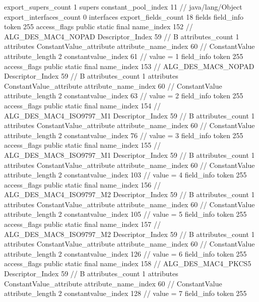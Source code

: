{{{			export_supers_count	1
			supers {
				constant_pool_index	11		// java/lang/Object
			}
			export_interfaces_count	0
			interfaces {
			}
			export_fields_count	18
			fields {
			field_info {
				token	255
				access_flags	public static final
				name_index	152		// ALG_DES_MAC4_NOPAD
				Descriptor_Index	59		// B
				attributes_count	1
				attributes {
				ConstantValue_attribute {
					attribute_name_index	60		// ConstantValue
					attribute_length	2
					constantvalue_index	61		// value = 1
				}
				}
			}
			field_info {
				token	255
				access_flags	public static final
				name_index	153		// ALG_DES_MAC8_NOPAD
				Descriptor_Index	59		// B
				attributes_count	1
				attributes {
				ConstantValue_attribute {
					attribute_name_index	60		// ConstantValue
					attribute_length	2
					constantvalue_index	63		// value = 2
				}
				}
			}
			field_info {
				token	255
				access_flags	public static final
				name_index	154		// ALG_DES_MAC4_ISO9797_M1
				Descriptor_Index	59		// B
				attributes_count	1
				attributes {
				ConstantValue_attribute {
					attribute_name_index	60		// ConstantValue
					attribute_length	2
					constantvalue_index	76		// value = 3
				}
				}
			}
			field_info {
				token	255
				access_flags	public static final
				name_index	155		// ALG_DES_MAC8_ISO9797_M1
				Descriptor_Index	59		// B
				attributes_count	1
				attributes {
				ConstantValue_attribute {
					attribute_name_index	60		// ConstantValue
					attribute_length	2
					constantvalue_index	103		// value = 4
				}
				}
			}
			field_info {
				token	255
				access_flags	public static final
				name_index	156		// ALG_DES_MAC4_ISO9797_M2
				Descriptor_Index	59		// B
				attributes_count	1
				attributes {
				ConstantValue_attribute {
					attribute_name_index	60		// ConstantValue
					attribute_length	2
					constantvalue_index	105		// value = 5
				}
				}
			}
			field_info {
				token	255
				access_flags	public static final
				name_index	157		// ALG_DES_MAC8_ISO9797_M2
				Descriptor_Index	59		// B
				attributes_count	1
				attributes {
				ConstantValue_attribute {
					attribute_name_index	60		// ConstantValue
					attribute_length	2
					constantvalue_index	126		// value = 6
				}
				}
			}
			field_info {
				token	255
				access_flags	public static final
				name_index	158		// ALG_DES_MAC4_PKCS5
				Descriptor_Index	59		// B
				attributes_count	1
				attributes {
				ConstantValue_attribute {
					attribute_name_index	60		// ConstantValue
					attribute_length	2
					constantvalue_index	128		// value = 7
				}
				}
			}
			field_info {
				token	255
}}}}}
